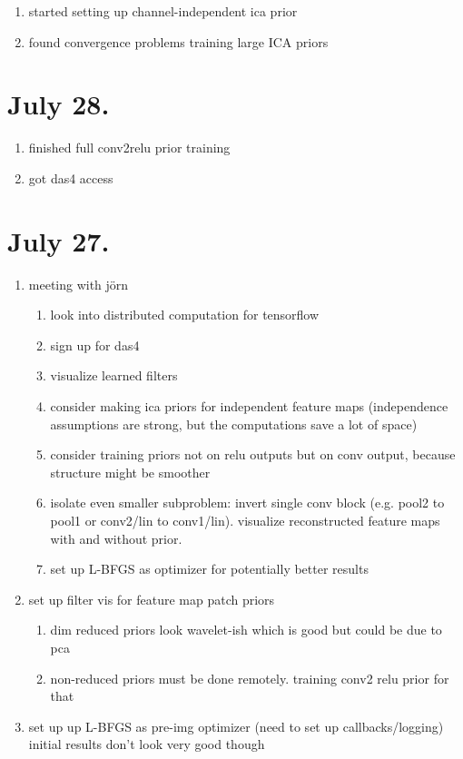 \documentclass{article}
\begin{document}
\begin{enumerate}
	\item started setting up channel-independent ica prior
	\item found convergence problems training large ICA priors
\end{enumerate}

\section*{July 28.}

\begin{enumerate}
	\item finished full conv2relu prior training
	\item got das4 access
\end{enumerate}

\section*{July 27.}

\begin{enumerate}
	\item meeting with jörn
	\begin{enumerate}
		\item look into distributed computation for tensorflow
		\item sign up for das4
		\item visualize learned filters
		\item consider making ica priors for independent feature maps (independence assumptions are strong, but the computations save a lot of space)
		\item consider training priors not on relu outputs but on conv output, because structure might be smoother
		\item isolate even smaller subproblem: invert single conv block (e.g. pool2 to pool1 or conv2/lin to conv1/lin). visualize reconstructed feature maps with and without prior. 
		\item set up L-BFGS as optimizer for potentially better results
	\end{enumerate}
	\item set up filter vis for feature map patch priors
	\begin{enumerate}
		\item dim reduced priors look wavelet-ish which is good but could be due to pca
		\item non-reduced priors must be done remotely. training conv2 relu prior for that
	\end{enumerate}
	\item set up up L-BFGS as pre-img optimizer (need to set up callbacks/logging) initial results don't look very good though
\end{enumerate}
\end{document}
